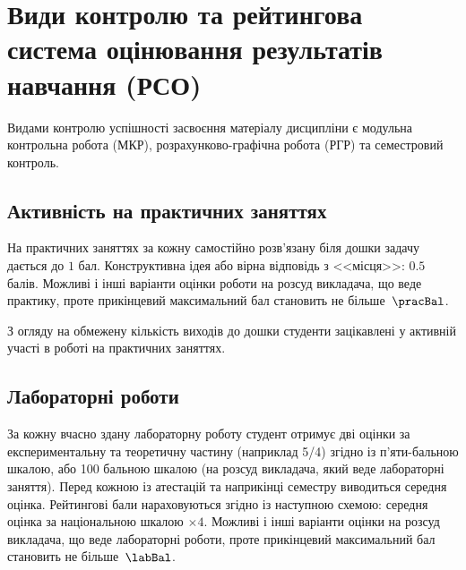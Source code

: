 \documentclass{Syllabus}
\begin{document}
\section{Види контролю та рейтингова система оцінювання результатів навчання (РСО)}

%

Видами контролю успішності засвоєння матеріалу дисципліни є  модульна контрольна робота (МКР), розрахунково-графічна робота (РГР) та семестровий контроль. 


\subsection*{Активність на практичних заняттях}

На практичних заняттях за кожну самостійно розв’язану біля дошки задачу дається до $1$ бал. Конструктивна ідея або вірна відповідь з <<місця>>: $0.5$ балів. Можливі і інші варіанти оцінки роботи на розсуд викладача, що веде практику, проте прикінцевий максимальний бал становить не більше~$\pracBal$.

З огляду на обмежену кількість виходів до дошки студенти зацікавлені у активній участі в роботі на практичних заняттях.

\subsection*{Лабораторні роботи}

За кожну вчасно здану лабораторну роботу студент отримує дві оцінки за експериментальну та теоретичну частину (наприклад 5/4) згідно із п'яти-бальною шкалою, або 100 бальною шкалою (на розсуд викладача, який веде лабораторні заняття). Перед кожною із атестацій та наприкінці семестру виводиться середня оцінка. Рейтингові бали нараховуються згідно із наступною схемою: середня оцінка за національною шкалою $\times 4$. Можливі і інші варіанти оцінки на розсуд викладача, що веде лабораторні роботи, проте прикінцевий максимальний бал становить не більше~$\labBal$.
\end{document}
